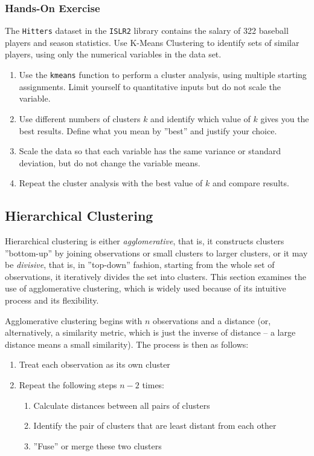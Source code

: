 \begin{tcolorbox}[colback=code]
\subsubsection*{Hands-On Exercise} 
The \texttt{Hitters} dataset in the \texttt{ISLR2} library contains the salary of 322 baseball players and season statistics. Use K-Means Clustering to identify sets of similar players, using only the numerical variables in the data set.

\begin{enumerate}
   \item Use the \texttt{kmeans} function to perform a cluster analysis, using multiple starting assignments. Limit yourself to quantitative inputs but do not scale the variable.
   \item Use different numbers of clusters $k$ and identify which value of $k$ gives you the best results. Define what you mean by ''best'' and justify your choice.
   \item Scale the data so that each variable has the same variance or standard deviation, but do not change the variable means. 
   \item Repeat the cluster analysis with the best value of $k$ and compare results.
\end{enumerate}
\end{tcolorbox}

\subsection{Hierarchical Clustering}

Hierarchical clustering is either \emph{agglomerative}, that is, it constructs clusters ''bottom-up'' by joining observations or small clusters to larger clusters, or it may be \emph{divisive}, that is, in ''top-down'' fashion, starting from the whole set of observations, it iteratively divides the set into clusters. This section examines the use of agglomerative clustering, which is widely used because of its intuitive process and its flexibility.

Agglomerative clustering begins with $n$ observations and a distance (or, alternatively, a similarity metric, which is just the inverse of distance -- a large distance means a small similarity). The process is then as follows:

\begin{enumerate}
   \item Treat each observation as its own cluster
   \item Repeat the following steps $n-2$ times:
   \begin{enumerate}
      \item Calculate distances between all pairs of clusters
      \item Identify the pair of clusters that are least distant from each other
      \item ''Fuse'' or merge these two clusters
   \end{enumerate}
\end{enumerate}

